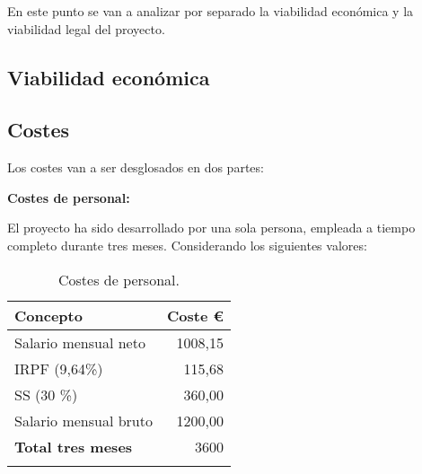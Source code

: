 En este punto se van a analizar por separado la viabilidad económica y la viabilidad legal del proyecto.

\subsection{Viabilidad económica}

\subsection{Costes}\label{costes}

Los costes van a ser desglosados en dos partes:

\textbf{Costes de personal:}

El proyecto ha sido desarrollado por una sola persona, empleada a tiempo completo durante tres meses. Considerando los siguientes valores:


\begin{longtable}[]{@{}lr@{}}
\toprule
\begin{minipage}[b]{0.38\columnwidth}\raggedright\strut
\textbf{Concepto}\strut
\end{minipage} & \begin{minipage}[b]{0.20\columnwidth}\raggedleft\strut
\textbf{Coste \euro{}}\strut
\end{minipage}\tabularnewline
\midrule
\endhead
\begin{minipage}[t]{0.38\columnwidth}\raggedright\strut
Salario mensual neto\strut
\end{minipage} & \begin{minipage}[t]{0.20\columnwidth}\raggedleft\strut
{1008,15}\strut
\end{minipage}\tabularnewline
\begin{minipage}[t]{0.38\columnwidth}\raggedright\strut
IRPF (9,64\%)\strut
\end{minipage} & \begin{minipage}[t]{0.20\columnwidth}\raggedleft\strut
115,68\strut
\end{minipage}\tabularnewline
\begin{minipage}[t]{0.38\columnwidth}\raggedright\strut
SS (30 \%)\strut
\end{minipage} & \begin{minipage}[t]{0.20\columnwidth}\raggedleft\strut
360,00\strut
\end{minipage}\tabularnewline
\begin{minipage}[t]{0.38\columnwidth}\raggedright\strut
Salario mensual bruto\strut
\end{minipage} & \begin{minipage}[t]{0.20\columnwidth}\raggedleft\strut
1200,00\strut
\end{minipage}\tabularnewline
\midrule
\begin{minipage}[t]{0.38\columnwidth}\raggedright\strut
\textbf{Total tres meses}\strut
\end{minipage} & \begin{minipage}[t]{0.20\columnwidth}\raggedleft\strut
3600\strut
\end{minipage}\tabularnewline
\bottomrule
\caption{Costes de personal.}
\end{longtable}

